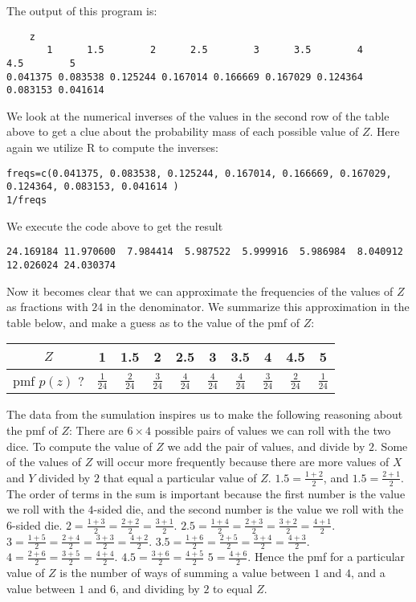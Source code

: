 \documentclass[a4paper,11pt]{article}
\begin{document}
The output of this program is:
\begin{lstlisting}
	z
       1      1.5        2      2.5        3      3.5        4      4.5        5
0.041375 0.083538 0.125244 0.167014 0.166669 0.167029 0.124364 0.083153 0.041614
\end{lstlisting}

We look at the numerical inverses of the values in the second row of the
table above to get a clue about the probability mass of each possible value
of $Z$.  Here again we utilize R to compute the inverses:

\begin{lstlisting}
freqs=c(0.041375, 0.083538, 0.125244, 0.167014, 0.166669, 0.167029, 0.124364, 0.083153, 0.041614 )
1/freqs
\end{lstlisting}

We execute the code above to get the result
\begin{lstlisting}
24.169184 11.970600  7.984414  5.987522  5.999916  5.986984  8.040912 12.026024 24.030374
\end{lstlisting}

Now it becomes clear that we can approximate the frequencies of the values of
$Z$ as fractions with $24$ in the denominator.  We summarize this approximation
in the table below, and make a guess as to the value of the pmf of $Z$:

\begin{center}
  \begin{tabular}{ | c | c | c | c | c | c | c | c | c | c |}
    \hline
	$Z$ & 1 & 1.5 & 2 & 2.5 & 3 & 3.5 & 4 & 4.5 & 5  \\ \hline
  pmf $p\left( z \right)$ ? & $\frac{1}{24}$ & $\frac{2}{24}$ & $\frac{3}{24}$ &
		$\frac{4}{24}$ & $\frac{4}{24}$ & $\frac{4}{24}$ & $\frac{3}{24}$ & $\frac{2}{24}$ &
		$\frac{1}{24}$ \\ \hline
  \end{tabular}
\end{center}
The data from the sumulation inspires us to make the following reasoning about
the pmf of $Z$:  There are $6 \times 4$ possible pairs of values we can roll
with the two dice.  To compute the value of $Z$ we add the pair of values, and
divide by $2$.  Some of the values of $Z$ will occur more frequently because
there are more values of $X$ and $Y$ divided by $2$ that equal a particular
value of $Z$.  $1.5=\frac{1+2}{2}$, and $1.5=\frac{2+1}{2}$.  The order of
terms in the sum is important because the first number is the value we roll
with the $4$-sided die, and the second number is the value we roll with the
$6$-sided die.  $2=\frac{1+3}{2}=\frac{2+2}{2}=\frac{3+1}{2}$.
$2.5=\frac{1+4}{2}=\frac{2+3}{2}=\frac{3+2}{2}=\frac{4+1}{2}$.
$3=\frac{1+5}{2}=\frac{2+4}{2}=\frac{3+3}{2}=\frac{4+2}{2}$.
$3.5=\frac{1+6}{2}=\frac{2+5}{2}=\frac{3+4}{2}=\frac{4+3}{2}$.
$4=\frac{2+6}{2}=\frac{3+5}{2}=\frac{4+4}{2}$.
$4.5=\frac{3+6}{2}=\frac{4+5}{2}$
$5=\frac{4+6}{2}$.  Hence the pmf for a particular value of $Z$ is the number
of ways of summing a value between $1$ and $4$, and a value between $1$ and
$6$, and dividing by $2$ to equal $Z$.
\end{document}
